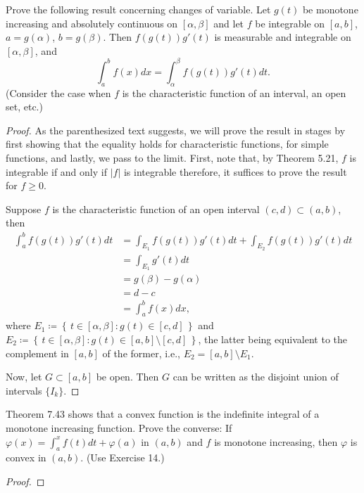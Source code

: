 
\begin{problem}
Prove the following result concerning changes of variable. Let $g(t)$ be
monotone increasing and absolutely continuous on $[\alpha,\beta]$ and let $f$
be integrable on $[a,b]$, $a= g(\alpha)$, $b=
g(\beta)$. Then $f(g(t))g'(t)$ is measurable and integrable on
$[\alpha,\beta]$, and
\[
\int_a^b f(x)d x=\int_\alpha^\beta f(g(t))g'(t)d t.
\]
(Consider the case when $f$ is the characteristic function of an interval,
an open set, etc.)
\end{problem}
\begin{proof}
As the parenthesized text suggests, we will prove the result in
stages by first showing that the equality holds for characteristic
functions, for simple functions, and lastly, we pass to the limit. First,
note that, by Theorem 5.21, $f$ is integrable if and only if $|f|$ is
integrable therefore, it suffices to prove the result for $f\geq 0$.

Suppose $f$ is the characteristic function of an open interval
$(c,d)\subset(a,b)$, then
\begin{equation}
\label{eq:11:char-fun-interval}
\begin{aligned}
\int_a^b f(g(t))g'(t)dt
&=\int_{E_1}f(g(t))g'(t)dt+\int_{E_2}f(g(t))g'(t)dt\\
&=\int_{E_1}g'(t)dt\\
&=g(\beta)-g(\alpha)\\
&=d-c\\
&=\int_a^b f(x)dx,
\end{aligned}
\end{equation}
where $E_1\coloneqq\left\{\,t\in[\alpha,\beta]:g(t)\in[c,d]\,\right\}$ and
$E_2\coloneqq\left\{\,t\in[\alpha,\beta]:g(t)\in[a,b]\setminus[c,d]\,\right\}$,
the latter being equivalent to the complement in $[a,b]$ of the former,
i.e., $E_2=[a,b]\setminus E_1$.

Now, let $G\subset[a,b]$ be open. Then $G$ can be written as the disjoint
union of intervals $\{I_k\}$.
\end{proof}
\newpage

\begin{problem}
Theorem 7.43 shows that a convex function is the indefinite integral of a
monotone increasing function. Prove the converse: If
$\varphi(x)=\int_a^xf(t)dt+\varphi(a)$ in $(a,b)$ and $f$ is monotone
increasing, then $\varphi$ is convex in $(a,b)$. (Use Exercise 14.)
\end{problem}
\begin{proof}
\end{proof}
\newpage

